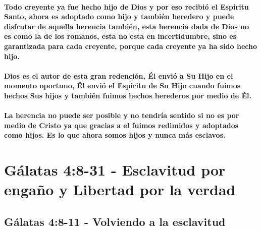 \documentclass[11a pt,twoside]{article}
\let\oldsection\section
\renewcommand{\section}{\needspace{6\baselineskip}\oldsection}
\let\oldsubsection\subsection
\renewcommand{\subsection}{\needspace{5\baselineskip}\oldsubsection}
\let\oldparagraph\paragraph
\renewcommand{\paragraph}{\needspace{3\baselineskip}\oldparagraph}
\begin{document}
\paragraph{Todo creyente ya fue hecho hijo de Dios y por eso recibió el
Espíritu Santo, ahora es adoptado como hijo y también heredero y puede
disfrutar de aquella herencia también, esta herencia dada de Dios no es
como la de los romanos, esta no esta en incertidumbre, sino es
garantizada para cada creyente, porque cada creyente ya ha sido hecho
hijo.}\label{todo-creyente-ya-fue-hecho-hijo-de-dios-y-por-eso-recibiuxf3-el-espuxedritu-santo-ahora-es-adoptado-como-hijo-y-tambiuxe9n-heredero-y-puede-disfrutar-de-aquella-herencia-tambiuxe9n-esta-herencia-dada-de-dios-no-es-como-la-de-los-romanos-esta-no-esta-en-incertidumbre-sino-es-garantizada-para-cada-creyente-porque-cada-creyente-ya-ha-sido-hecho-hijo.}

\paragraph{Dios es el autor de esta gran redención, Él envió a Su Hijo
en el momento oportuno, Él envió el Espíritu de Su Hijo cuando fuimos
hechos Sus hijos y también fuimos hechos herederos por medio de
Él.}\label{dios-es-el-autor-de-esta-gran-redenciuxf3n-uxe9l-enviuxf3-a-su-hijo-en-el-momento-oportuno-uxe9l-enviuxf3-el-espuxedritu-de-su-hijo-cuando-fuimos-hechos-sus-hijos-y-tambiuxe9n-fuimos-hechos-herederos-por-medio-de-uxe9l.}

\paragraph{La herencia no puede ser posible y no tendría sentido si no
es por medio de Cristo ya que gracias a el fuimos redimidos y adoptados
como hijos. Es lo que ahora somos hijos y nunca más
esclavos.}\label{la-herencia-no-puede-ser-posible-y-no-tendruxeda-sentido-si-no-es-por-medio-de-cristo-ya-que-gracias-a-el-fuimos-redimidos-y-adoptados-como-hijos.-es-lo-que-ahora-somos-hijos-y-nunca-muxe1s-esclavos.}

\section{Gálatas 4:8-31 - Esclavitud por engaño y Libertad por la
verdad}\label{guxe1latas-48-31---esclavitud-por-engauxf1o-y-libertad-por-la-verdad}

\subsection{Gálatas 4:8-11 - Volviendo a la
esclavitud}\label{guxe1latas-48-11---volviendo-a-la-esclavitud}
\end{document}
